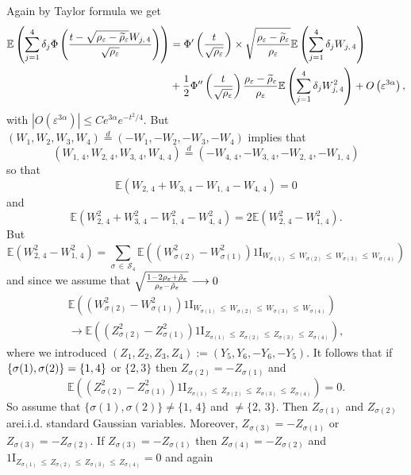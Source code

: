\documentclass[10pt]{amsart}
\theoremstyle{definition}\newtheorem{defi}[theo]{Definition}\newtheorem{rema}[theo]{Remark}\newtheorem{exam}[theo]{Example}\newtheorem{exem}[theo]{Example}\newtheorem{nota}[theo]{Notation}
\newcommand{\E}{\mathbb{E}}
\newcommand{\ind}{{1\!\!\mathrm{I}}}
\newcommand{\eps}{\varepsilon}
\newcommand{\calS}{\mathcal{S}}
\let\oldtilde\tilde
\renewcommand*{\tilde}[1]{\mathchoice{\widetilde{#1}}{\widetilde{#1}}{\oldtilde{#1}}{\oldtilde{#1}}}
\begin{document}
Again by Taylor formula we get
\begin{align*}
\E\left(\sum_{j=1}^{4}\delta_j
\Phi\left(\frac{t-\sqrt{\rho_\eps-\tilde{\rho}_\eps}W_{j,\,4}}{\sqrt{\rho_\eps}}\right)\right)&=
\Phi'\left(\frac{t}{\sqrt{\rho_\eps}}\right)\times \sqrt{\frac{\rho_\eps-\tilde{\rho}_\eps}{\rho_\eps}}\E\left(\sum_{j=1}^{4}\delta_j W_{j,\,4}\right)\\
&+\frac{1}{2}\Phi''\left(\frac{t}{\sqrt{\rho_\eps}}\right)\frac{\rho_\eps-\tilde{\rho}_\eps}{\rho_\eps}\E\left(\sum_{j=1}^{4}\delta_j W_{j,\,4}^2\right)+O\left(\eps^{3\alpha}\right),
\end{align*}
with $|O(\eps^{3\alpha})|\le Ce^{3\alpha}e^{-t^2/4}$. But $(W_1,W_2,W_3,W_4)\stackrel{d}{=}(-W_1,-W_2,-W_3,-W_4)$ implies that
\[
\left(W_{1,\,4},W_{2,\,4},W_{3,\,4},W_{4,\,4}\right)\stackrel{d}{=}\left(-W_{4,\,4},-W_{3,\,4},-W_{2,\,4},-W_{1,\,4}\right)
\]
so that
\[
\E\left(W_{2,\,4}+W_{3,\,4}-W_{1,\,4}-W_{4,\,4}\right)=0
\]
and
\[
\E\left(W_{2,\,4}^2+W_{3,\,4}^2-W_{1,\,4}^2-W_{4,\,4}^2\right)=2\E\left(W_{2,\,4}^2-W_{1,\,4}^2\right).
\]
But
\[
\E\left(W_{2,\,4}^2-W_{1,\,4}^2\right)=\sum_{\sigma\,\in\,\calS_4}
\E\left(\left(W_{\sigma(2)}^2-W_{\sigma(1)}^2\right)\ind_{W_{\sigma(1)}\,\le\,W_{\sigma(2)}\,\le\,W_{\sigma(3)}\,\le\,W_{\sigma(4)}}\right)
\]
and since we assume that $\sqrt{\frac{1-2\rho_\eps+\tilde{\rho}_\eps}{\rho_\eps-\tilde{\rho}_\eps}}\longrightarrow 0$
\begin{multline*}
\E\left(\left(W_{\sigma(2)}^2-W_{\sigma(1)}^2\right)\ind_{W_{\sigma(1)}\,\le\,W_{\sigma(2)}\,\le\,W_{\sigma(3)}\,\le\,W_{\sigma(4)}}\right)\\
\longrightarrow \E\left(\left(Z_{\sigma(2)}^2-Z_{\sigma(1)}^2\right)\ind_{Z_{\sigma(1)}\,\le\, Z_{\sigma(2)}\,\le\,Z_{\sigma(3)}\,\le\, Z_{\sigma(4)}}\right),
\end{multline*}
where we introduced $(Z_1,Z_2,Z_3,Z_4):=(Y_5,Y_6,-Y_6,-Y_5)$. It follows that if $\{\sigma(1),\linebreak\sigma(2)\}=\{1,4\}$ or $\{2,3\}$ then $Z_{\sigma(2)} =-Z_{\sigma(1)}$ and
\[
\E\left(\left(Z_{\sigma(2)}^2-Z_{\sigma(1)}^2\right)\ind_{Z_{\sigma(1)}\,\le\,Z_{\sigma(2)}\,\le\,Z_{\sigma(3)}\,\le\,Z_{\sigma(4)}}\right)=0.
\]
So assume that $\{\sigma(1),\sigma(2)\}\neq \{1,\,4\}$ and $\neq \{2,\,3\}$. Then $Z_{\sigma(1)}$ and $Z_{\sigma(2)}$ are\linebreak i.i.d. standard Gaussian variables. Moreover, $Z_{\sigma(3)}=-Z_{\sigma(1)}$ or $Z_{\sigma(3)}=-Z_{\sigma(2)}$. If $Z_{\sigma(3)}=-Z_{\sigma(1)}$ then $Z_{\sigma(4)}=-Z_{\sigma(2)}$ and $\ind_{Z_{\sigma(1)}\,\le\,Z_{\sigma(2)}\,\le\, Z_{\sigma(3)}\,\le\,Z_{\sigma(4)}}=0$ and again
\end{document}

